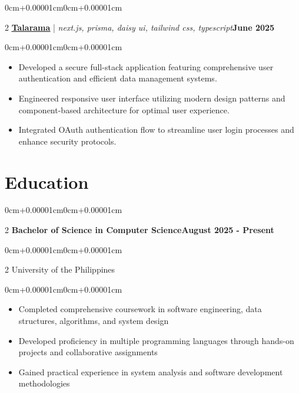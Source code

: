 \documentclass[11pt, letterpaper]{article}
\newenvironment{highlights}{\begin{itemize}[topsep=0.10cm,parsep=0.10cm,partopsep=0pt,itemsep=0pt,leftmargin=0cm+12pt]}{\end{itemize}}
\newenvironment{onecolentry}{\begin{adjustwidth}{0cm+0.00001cm}{0cm+0.00001cm}}{\end{adjustwidth}}
\newenvironment{twocolentry}[2][]{\onecolentry\def\secondColumn{#2}\setcolumnwidth{\fill,5.5cm}\begin{paracol}{2}}{\switchcolumn \raggedleft \secondColumn\end{paracol}\endonecolentry}
\let\hrefWithoutArrow\href
\begin{document}
    \vspace{0.15cm}
    \begin{twocolentry}{\textbf{June 2025}}
        \textbf{\textcolor{blue}{\underline{\hrefWithoutArrow{https://github.com/jlescarlan11/talarama}{Talarama}}}} | \textit{next.js, prisma, daisy ui, tailwind css, typescript}\end{twocolentry}
    \vspace{0.10cm}
    \begin{onecolentry}
        \begin{highlights}
            \item Developed a secure full-stack application featuring comprehensive user authentication and efficient data management systems.
            \item Engineered responsive user interface utilizing modern design patterns and component-based architecture for optimal user experience.
            \item Integrated OAuth authentication flow to streamline user login processes and enhance security protocols.
        \end{highlights}
    \end{onecolentry}
    \vspace{0.15cm}

\section{Education}

    \begin{twocolentry}{\textbf{August 2025 - Present}}
    \textbf{Bachelor of Science in Computer Science}\end{twocolentry}
    \vspace{0.05cm}
    \begin{twocolentry}{}
    University of the Philippines\end{twocolentry}
    \vspace{0.10cm}
    \begin{onecolentry}
        \begin{highlights}
            \item Completed comprehensive coursework in software engineering, data structures, algorithms, and system design
            \item Developed proficiency in multiple programming languages through hands-on projects and collaborative assignments
            \item Gained practical experience in system analysis and software development methodologies
        \end{highlights}
    \end{onecolentry}
    \vspace{0.15cm}
\end{document}
